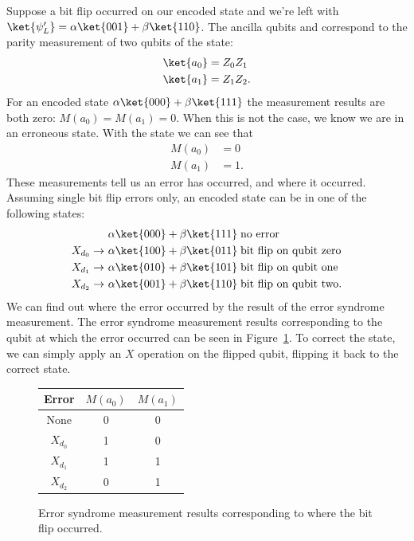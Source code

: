 \documentclass[11pt, notitlepage]{report}
\begin{document}
\noindent
Suppose a bit flip occurred on our encoded state  and we're left with $\ket{\psi_L'} = \alpha\ket{001} + \beta\ket{110}$. The ancilla qubits  and  correspond to the parity measurement of two qubits of the state:
\begin{align}
  \ket{a_0} &= Z_0Z_1 \\
  \ket{a_1} &= Z_1Z_2.
\end{align}
For an encoded state $\alpha\ket{000} + \beta\ket{111}$ the measurement results are both zero: $M(a_0) = M(a_1) = 0$. When this is not the case, we know we are in an erroneous state. With the state  we can see that
\begin{align}
  M(a_0) &= 0 \\
  M(a_1) &= 1.
\end{align}
These measurements tell us an error has occurred, and where it occurred. Assuming single bit flip errors only, an encoded state can be in one of the following states:
\begin{align}
  &\alpha\ket{000} + \beta\ket{111} \; \text{no error} \\
  X_{d_0} \rightarrow \  &\alpha\ket{100} + \beta\ket{011} \; \text{bit flip on qubit zero} \\
  X_{d_1} \rightarrow \  &\alpha\ket{010} + \beta\ket{101} \; \text{bit flip on qubit one} \\
  X_{d_2} \rightarrow \  &\alpha\ket{001} + \beta\ket{110} \; \text{bit flip on qubit two}.
\end{align}
We can find out where the error occurred by the result of the error syndrome measurement. The error syndrome measurement results corresponding to the qubit at which the error occurred can be seen in Figure~\ref{fig:zz_stabilizer_measurement_results}. To correct the state, we can simply apply an $X$ operation on the flipped qubit, flipping it back to the correct state.
\begin{figure}[ht]
  \centering
  \begin{tabular}{c|c|c}
    Error & $M(a_0)$ & $M(a_1)$ \\ \hline
    None & 0 & 0 \\
    $X_{d_0}$ & 1 & 0 \\
    $X_{d_1}$ & 1 & 1 \\
    $X_{d_2}$ & 0 & 1
  \end{tabular}
  \caption{Error syndrome measurement results corresponding to where the bit flip occurred.}
  \label{fig:zz_stabilizer_measurement_results}
\end{figure}
\end{document}
